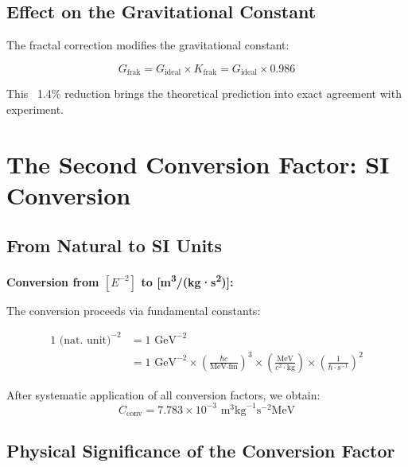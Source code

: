 	\subsection{Effect on the Gravitational Constant}
	
	The fractal correction modifies the gravitational constant:
	
	\begin{equation}
		G_{\text{frak}} = G_{\text{ideal}} \times K_{\text{frak}} = G_{\text{ideal}} \times 0.986
	\end{equation}
	
	This ~1.4\% reduction brings the theoretical prediction into exact agreement with experiment.
	
	\section{The Second Conversion Factor: SI Conversion}
	
	\subsection{From Natural to SI Units}
	
	\begin{dimensional}
		\textbf{Conversion from $[E^{-2}]$ to [m\textsuperscript{3}/(kg·s\textsuperscript{2})]:}
		
		The conversion proceeds via fundamental constants:
		
		\begin{align}
			1 \text{ (nat. unit)}^{-2} &= 1 \text{ GeV}^{-2} \\
			&= 1 \text{ GeV}^{-2} \times \left(\frac{\hbar c}{\text{MeV·fm}}\right)^3 \times \left(\frac{\text{MeV}}{c^2 \cdot \text{kg}}\right) \times \left(\frac{1}{\hbar \cdot \text{s}^{-1}}\right)^2
		\end{align}
		
		After systematic application of all conversion factors, we obtain:
		\begin{equation}
			C_{\text{conv}} = 7.783 \times 10^{-3} \text{ m}^3\text{kg}^{-1}\text{s}^{-2}\text{MeV}
		\end{equation}
	\end{dimensional}
	
	\subsection{Physical Significance of the Conversion Factor}
	
